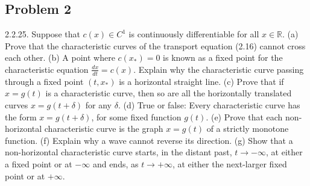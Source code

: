 \subsection*{Problem 2}
2.2.25. Suppose that $c(x) \in C^1$ is continuously differentiable for all $x \in \mathbb{R}$. (a) Prove that the characteristic curves of the transport equation (2.16) cannot cross each other. (b) A point where $c(x_*) = 0$ is known as a fixed point for the characteristic equation $\frac{dx}{dt} = c(x)$. Explain why the characteristic curve passing through a fixed point $(t, x_*)$ is a horizontal straight line. (c) Prove that if $x = g(t)$ is a characteristic curve, then so are all the horizontally translated curves $x = g(t + \delta)$ for any $\delta$. (d) True or false: Every characteristic curve has the form $x = g(t + \delta)$, for some fixed function $g(t)$. (e) Prove that each non-horizontal characteristic curve is the graph $x = g(t)$ of a strictly monotone function. (f) Explain why a wave cannot reverse its direction. (g) Show that a non-horizontal characteristic curve starts, in the distant past, $t \to -\infty$, at either a fixed point or at $-\infty$ and ends, as $t \to +\infty$, at either the next-larger fixed point or at $+\infty$.
